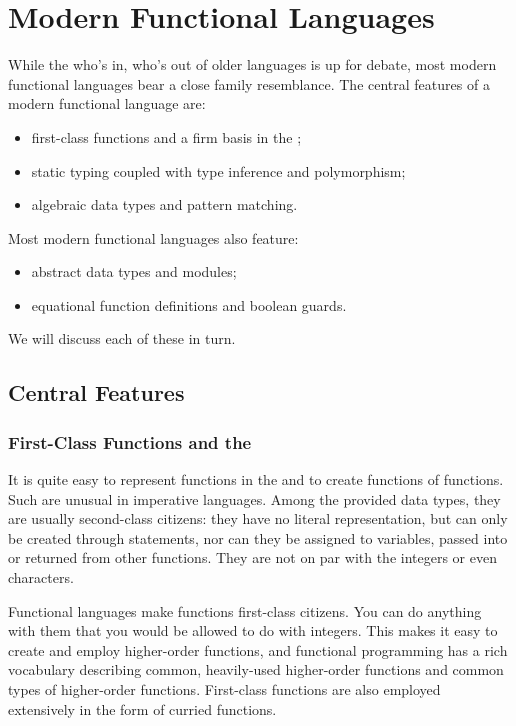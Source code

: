 \section{Modern Functional Languages}
While the who's in, who's out of older languages is up for debate, most modern functional languages bear a close family resemblance. The central features of a modern functional language are:
\begin{itemize}
\item
first-class functions and a firm basis in the \lambdacalc;
\item
static typing coupled with type inference and polymorphism;
\item
algebraic data types and pattern matching.
\end{itemize}
Most modern functional languages also feature:
\begin{itemize}
\item
abstract data types and modules;
\item
equational function definitions and boolean guards.
\end{itemize}
We will discuss each of these in turn.

\subsection{Central Features}
\subsubsection{First-Class Functions and the \LambdaCalc}
It is quite easy to represent functions in the \lambdacalc and to create functions of functions. Such  are unusual in imperative languages. Among the provided data types, they are usually second-class citizens: they have no literal representation, but can only be created through statements, nor can they be assigned to variables, passed into or returned from other functions. They are not on par with the integers or even characters.

Functional languages make functions first-class citizens. You can do anything with them that you would be allowed to do with integers. This makes it easy to create and employ higher-order functions, and functional programming has a rich vocabulary describing common, heavily-used higher-order functions and common types of higher-order functions. First-class functions are also employed extensively in the form of curried functions.

